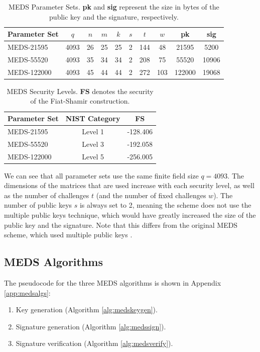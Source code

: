 \documentclass[11pt,a4paper]{report}
\begin{document}
\begin{table}
  \centering
  \begin{tabular}{lccccccccc}
    \toprule
    \textbf{Parameter Set} & \textbf{$q$} & \textbf{$n$} & \textbf{$m$} & \textbf{$k$} & \textbf{$s$} & \textbf{$t$} & \textbf{$w$} & \textbf{pk} & \textbf{sig} \\
    \midrule
    MEDS-21595 & 4093 & 26 & 25 & 25 & 2 & 144 & 48 & 21595 & 5200 \\
    MEDS-55520 & 4093 & 35 & 34 & 34 & 2 & 208 & 75 & 55520 & 10906 \\
    MEDS-122000 & 4093 & 45 & 44 & 44 & 2 & 272 & 103 & 122000 & 19068 \\
    \bottomrule
  \end{tabular}
  \caption{MEDS Parameter Sets. \textbf{pk} and \textbf{sig} represent the size in bytes of the public key and the signature, respectively.}
  \label{tab:medsparametersets}
\end{table}

\begin{table}
  \centering
  \begin{tabular}{lcc}
    \toprule
    \textbf{Parameter Set} & \textbf{NIST Category} & \textbf{FS} \\
    \midrule
    MEDS-21595 & Level 1 & -128.406 \\
    MEDS-55520 & Level 3 & -192.058 \\
    MEDS-122000 & Level 5 & -256.005 \\
    \bottomrule
  \end{tabular}
  \caption{MEDS Security Levels. \textbf{FS} denotes the security of the Fiat-Shamir construction.}
  \label{tab:medssecuritylevels}
\end{table}

We can see that all parameter sets use the same finite field size $q = 4093$. The dimensions of the matrices that are used increase with each security level, as well as the number of challenges $t$ (and the number of fixed challenges $w$). The number of public keys $s$ is always set to 2, meaning the scheme does not use the multiple public keys technique, which would have greatly increased the size of the public key and the signature. Note that this differs from the original MEDS scheme, which used multiple public keys \cite{chou2023meds}.

\subsection{MEDS Algorithms}
\label{sec:medsalgorithms}
The pseudocode for the three MEDS algorithms is shown in Appendix \ref{app:medsalgs}:
\begin{enumerate}
  \item Key generation (Algorithm \ref{alg:medskeygen}).
  \item Signature generation (Algorithm \ref{alg:medssign}).
  \item Signature verification (Algorithm \ref{alg:medsverify}).
\end{enumerate}
\end{document}
